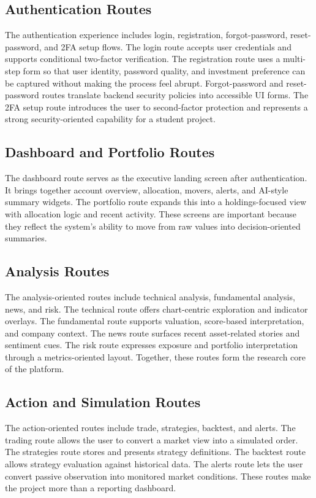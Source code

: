 \documentclass[12pt,a4paper]{report}
\begin{document}
\subsection{Authentication Routes}
The authentication experience includes login, registration, forgot-password, reset-password, and 2FA setup flows. The login route accepts user credentials and supports conditional two-factor verification. The registration route uses a multi-step form so that user identity, password quality, and investment preference can be captured without making the process feel abrupt. Forgot-password and reset-password routes translate backend security policies into accessible UI forms. The 2FA setup route introduces the user to second-factor protection and represents a strong security-oriented capability for a student project.

\subsection{Dashboard and Portfolio Routes}
The dashboard route serves as the executive landing screen after authentication. It brings together account overview, allocation, movers, alerts, and AI-style summary widgets. The portfolio route expands this into a holdings-focused view with allocation logic and recent activity. These screens are important because they reflect the system's ability to move from raw values into decision-oriented summaries.

\subsection{Analysis Routes}
The analysis-oriented routes include technical analysis, fundamental analysis, news, and risk. The technical route offers chart-centric exploration and indicator overlays. The fundamental route supports valuation, score-based interpretation, and company context. The news route surfaces recent asset-related stories and sentiment cues. The risk route expresses exposure and portfolio interpretation through a metrics-oriented layout. Together, these routes form the research core of the platform.

\subsection{Action and Simulation Routes}
The action-oriented routes include trade, strategies, backtest, and alerts. The trading route allows the user to convert a market view into a simulated order. The strategies route stores and presents strategy definitions. The backtest route allows strategy evaluation against historical data. The alerts route lets the user convert passive observation into monitored market conditions. These routes make the project more than a reporting dashboard.
\end{document}
